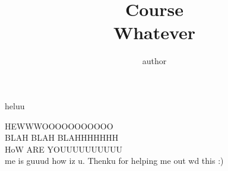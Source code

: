 \documentclass[addpoints]{exam}
\title{Course\\ Whatever}
\author{author}
\begin{document}
\maketitle

\begin{questions}
    \question
     heluu
    \begin{solution}
        HEWWWOOOOOOOOOOO \\ 
        BLAH BLAH BLAHHHHHHH \\ 
        HoW ARE YOUUUUUUUUUU \\
        me is guuud how iz u.
        Thenku for helping me out wd this :)
    \end{solution}
    
\end{questions}
\end{document}
